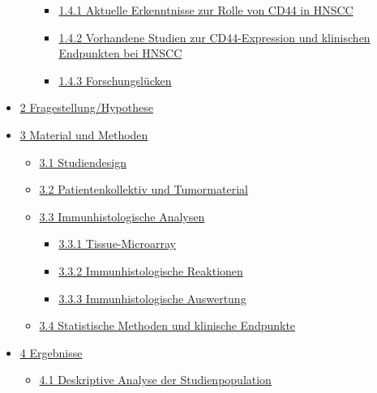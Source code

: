 \begin{itemize}
\begin{itemize}
    \begin{itemize}
    \tightlist
    \item
      \protect\hyperlink{1-4-1-aktuelle-erkenntnisse-zur-rolle-von-cd44-in-hnscc}{1.4.1 Aktuelle Erkenntnisse zur Rolle von CD44 in HNSCC}
    \item
      \protect\hyperlink{1-4-2-vorhandene-studien-zur-cd44-expression-und-klinischen-endpunkten-bei-hnscc}{1.4.2 Vorhandene Studien zur CD44-Expression und klinischen Endpunkten bei HNSCC}
    \item
      \protect\hyperlink{1-4-3-forschungsluxfccken}{1.4.3 Forschungslücken}
    \end{itemize}
  \end{itemize}
\item
  \protect\hyperlink{2-fragestellunghypothese}{2 Fragestellung/Hypothese}
\item
  \protect\hyperlink{3-material-und-methoden}{3 Material und Methoden}

  \begin{itemize}
  \tightlist
  \item
    \protect\hyperlink{3-1-studiendesign}{3.1 Studiendesign}
  \item
    \protect\hyperlink{3-2-patientenkollektiv-und-tumormaterial}{3.2 Patientenkollektiv und Tumormaterial}
  \item
    \protect\hyperlink{3-3-immunhistologische-analysen}{3.3 Immunhistologische Analysen}

    \begin{itemize}
    \tightlist
    \item
      \protect\hyperlink{3-3-1-tissue-microarray}{3.3.1 Tissue-Microarray}
    \item
      \protect\hyperlink{3-3-2-immunhistologische-reaktionen}{3.3.2 Immunhistologische Reaktionen}
    \item
      \protect\hyperlink{3-3-3-immunhistologische-auswertung}{3.3.3 Immunhistologische Auswertung}
    \end{itemize}
  \item
    \protect\hyperlink{3-4-statistische-methoden-und-klinischen-endpunkten}{3.4 Statistische Methoden und klinische Endpunkte}
  \end{itemize}
\item
  \protect\hyperlink{4-ergebnisse}{4 Ergebnisse}

  \begin{itemize}
  \tightlist
  \item
    \protect\hyperlink{4-1-deskriptive-analyse-der-studienpopulation}{4.1 Deskriptive Analyse der Studienpopulation}


\end{itemize}
\end{itemize}
